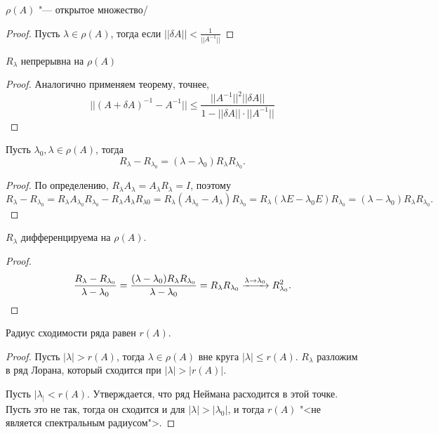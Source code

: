 \documentclass[main]{subfiles}
\begin{document}
\begin{proposition}
  $\rho(A)$ "--- открытое множество/
\end{proposition}
\begin{proof}
  Пусть $\lambda \in \rho(A)$, тогда
  если $||\delta A|| < \frac{1}{||A^{-1}||}$
\end{proof}

\begin{proposition}
  $R_\lambda$ непрерывна на $\rho(A)$
\end{proposition}
\begin{proof}
  Аналогично применяем теорему, точнее,
  \[ ||(A + \delta A)^{-1} - A^{-1}|| \le
    \frac{||A^{-1}||^2 ||\delta A||}{1 - ||\delta A|| \cdot ||A^{-1}||}
  \]
\end{proof}

\begin{proposition}
  Пусть $\lambda_0, \lambda \in \rho(A)$, тогда
  \[
    R_\lambda - R_{\lambda_0} = (\lambda - \lambda_0)
    R_\lambda R_{\lambda_0}.
  \]
\end{proposition}
\begin{proof}
  По определению, $R_\lambda A_\lambda = A_\lambda R_\lambda = I$,
  поэтому
  \[ R_\lambda - R_{\lambda_0} = 
    R_\lambda A_{\lambda_0} R_{\lambda_0} -
    R_\lambda A_\lambda R_{\lambda 0} =
    R_\lambda (A_{\lambda_0} - A_\lambda) R_{\lambda_0} =
    R_\lambda (\lambda E - \lambda_0 E) R_{\lambda_0} =
    (\lambda - \lambda_0) R_\lambda R_{\lambda_0}.
  \]
\end{proof}

\begin{proposition}
  $R_\lambda$ дифференцируема на $\rho(A)$.
\end{proposition}
\begin{proof}
  \[  \frac{R_\lambda - R_{\lambda_0}}{\lambda - \lambda_0} =
    \frac{(\lambda - \lambda_0) R_\lambda R_{\lambda_0}}{\lambda - \lambda_0} =
    R_\lambda R_{\lambda_0} \xrightarrow{\lambda \to \lambda_0} R_{\lambda_0}^2.
    \qedhere
  \]
\end{proof}

\begin{proposition}
  Радиус сходимости ряда равен $r(A)$.
\end{proposition}
\begin{proof}
  Пусть $|\lambda| > r(A)$, тогда $\lambda \in \rho(A)$
  вне круга $|\lambda| \le r(A)$.
  $R_\lambda$ разложим в ряд Лорана, который
  сходится при $|\lambda| > |r(A)|$.
  
  Пусть $|\lambda_| < r(A)$. Утверждается, что ряд Неймана
  расходится в этой точке. Пусть это не так, тогда
  он сходится и для $|\lambda| > |\lambda_0|$,
  и тогда $r(A)$ "<не является спектральным радиусом">.
\end{proof}
\end{document}
